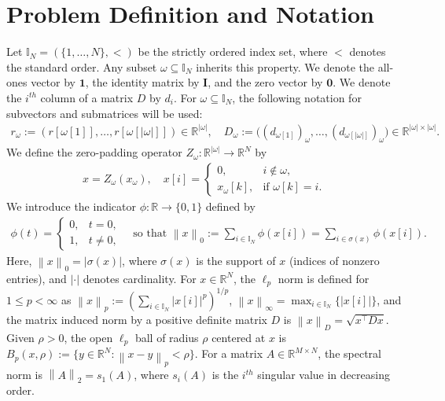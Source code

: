 \documentclass[11pt]{article}
\theoremstyle{plain}
\theoremstyle{definition}
\theoremstyle{plain}
\newcommand{\one}{{\mathbf 1}} %
\newcommand{\RR}{{\mathbb R}} %
\newcommand{\II}{{\mathbb I}}
\newcommand{\norm}[1]{\left\lVert#1\right\rVert}
\newcommand{\abs}[1]{\left\lvert#1\right\rvert}
\newcommand{\tpose}[1]{#1^{\top}}
\begin{document}
\section{Problem Definition and Notation}\label{probdef}
Let $\II_N=(\{1,\dots,N\},<)$ be the strictly ordered index set, where $<$ denotes the standard order. Any subset $\omega\subseteq\II_N$ inherits this property. We denote the all-ones vector by $\one$, the identity matrix by $\mathbf{I}$, and the zero vector by $\mathbf{0}$. We denote the $i^{th}$ column of a matrix $D$ by $d_i$. For $\omega\subseteq\II_N$, the following notation for subvectors and submatrices will be used:
\begin{align*}
	r_\omega:=(r[\omega[1]],\dots,r[\omega[\abs{\omega}]])\in\RR^{\abs{\omega}},
	\quad D_\omega:=\big((d_{\omega[1]})_\omega,\dots,(d_{\omega[\abs{\omega}]})_\omega\big) \in \RR^{\abs{\omega}\times\abs{\omega}}.
\end{align*}
We define the zero-padding operator $Z_\omega:\RR^{\abs{\omega}}\rightarrow\RR^N$ by
\begin{align*}
x=Z_\omega(x_\omega), \quad
x[i]=\begin{cases}
0,& i\notin\omega,\\
x_\omega[k],& \text{if } \omega[k]=i.
\end{cases}
\end{align*}
We introduce the indicator $\phi:\RR\rightarrow\{0,1\}$ defined by
\begin{align*}
\phi(t)=\begin{cases}
0, & t=0,\\
1, & t\neq 0,
\end{cases}
\quad \text{so that } \norm{x}_0:=\sum_{i\in\II_N} \phi(x[i])=\sum_{i\in\sigma(x)}\phi(x[i]).
\end{align*}
Here, $\norm{x}_0=\abs{\sigma(x)}$, where $\sigma(x)$ is the support of $x$ (indices of nonzero entries), and $\abs{\cdot}$ denotes cardinality.
For $x\in\RR^N$, the $\ell_p$ norm is defined for $1\leq p<\infty$ as $\norm{x}_p:=\left(\sum_{i\in\II_N} \abs{x[i]}^p\right)^{1/p}$, $\norm{x}_\infty=\max_{i\in\II_N}\{\abs{x[i]}\}$,  and the matrix induced norm by a positive definite matrix $D$ is $\norm{x}_D=\sqrt{\tpose{x}Dx}$. Given $\rho>0$, the open $\ell_p$ ball of radius $\rho$ centered at $x$ is $B_p(x,\rho):=\{y\in\RR^N:\norm{x-y}_p<\rho\}$. For a matrix $A\in\RR^{M\times N}$, the spectral norm is $\norm{A}_2=s_1(A)$, where $s_i(A)$ is the $i^{th}$ singular value in decreasing order. 
\end{document}
